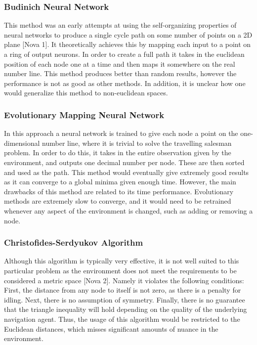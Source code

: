 \documentclass{article}
\begin{document}
	\subsubsection{Budinich Neural Network}
	This method was an early attempts at using the self-organizing properties of neural networks to produce a single cycle path on some number of points on a 2D plane [Nova 1]. It theoretically achieves this by mapping each input to a point on a ring of output neurons. In order to create a full path it takes in the euclidean position of each node one at a time and then maps it somewhere on the real number line. This method produces better than random results, however the performance is not as good as other methods. In addition, it is unclear how one would generalize this method to non-euclidean spaces.
	
	\subsubsection{Evolutionary Mapping Neural Network}
	\label{evol_nn}
	In this approach a neural network is trained to give each node a point on the one-dimensional number line, where it is trivial to solve the travelling salesman problem. In order to do this, it takes in the entire observation given by the environment, and outputs one decimal number per node. These are then sorted and used as the path. This method would eventually give extremely good results as it can converge to a global minima given enough time. However, the main drawbacks of this method are related to its time performance. Evolutionary methods are extremely slow to converge, and it would need to be retrained whenever any aspect of the environment is changed, such as adding or removing a node.
	
	\subsubsection{Christofides-Serdyukov Algorithm}
	Although this algorithm is typically very effective, it is not well suited to this particular problem as the environment does not meet the requirements to be considered a metric space [Nova 2]. Namely it violates the following conditions: First, the distance from any node to itself is not zero, as there is a penalty for idling. Next, there is no assumption of symmetry. Finally, there is no guarantee that the triangle inequality will hold depending on the quality of the underlying navigation agent. Thus, the usage of this algorithm would be restricted to the Euclidean distances, which misses significant amounts of nuance in the environment.
	
\end{document}
